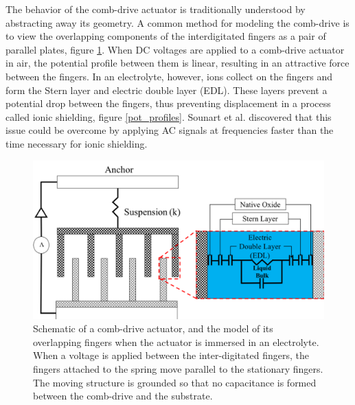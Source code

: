 The behavior of the comb-drive actuator is traditionally understood by abstracting away its geometry. A common method for modeling the comb-drive is to view the overlapping components of the interdigitated fingers as a pair of parallel plates, figure \ref{finger_to_plates}. When DC voltages are applied to a comb-drive actuator in air, the potential profile between them is linear, resulting in an attractive force between the fingers. In an electrolyte, however, ions collect on the fingers and form the Stern layer and electric double layer (EDL). These layers prevent a potential drop between the fingers, thus preventing displacement in a process called ionic shielding, figure \ref{pot_profiles}. Sounart et al. discovered that this issue could be overcome by applying AC signals at frequencies faster than the time necessary for ionic shielding\cite{Sounart2005}. 

\begin{figure}[h]
    \includegraphics[width=\linewidth]{Chapter2/Figs/Raster/fingers_to_plates_electrolyte.png}
    \caption{Schematic of a comb-drive actuator, and the model of its overlapping fingers when the actuator is immersed in an electrolyte. When a voltage is applied between the inter-digitated fingers, the fingers attached to the spring move parallel to the  stationary fingers. The moving structure is grounded so that no capacitance is formed between the comb-drive and the substrate.} \label{finger_to_plates}
\end{figure}


